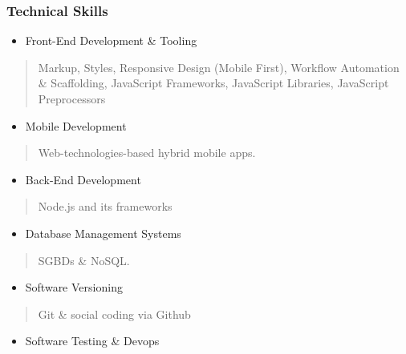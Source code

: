 \documentclass[]{article}
\providecommand{\tightlist}{%
  \setlength{\itemsep}{0pt}\setlength{\parskip}{0pt}}
\begin{document}
\subsubsection{Technical Skills}\label{technical-skills}

\begin{itemize}
\tightlist
\item
  Front-End Development \& Tooling
\end{itemize}

\begin{quote}
Markup, Styles, Responsive Design (Mobile First), Workflow Automation \&
Scaffolding, JavaScript Frameworks, JavaScript Libraries, JavaScript
Preprocessors
\end{quote}

\begin{itemize}
\tightlist
\item
  Mobile Development
\end{itemize}

\begin{quote}
Web-technologies-based hybrid mobile apps.
\end{quote}

\begin{itemize}
\tightlist
\item
  Back-End Development
\end{itemize}

\begin{quote}
Node.js and its frameworks
\end{quote}

\begin{itemize}
\tightlist
\item
  Database Management Systems
\end{itemize}

\begin{quote}
SGBDs \& NoSQL.
\end{quote}

\begin{itemize}
\tightlist
\item
  Software Versioning
\end{itemize}

\begin{quote}
Git \& social coding via Github
\end{quote}

\begin{itemize}
\tightlist
\item
  Software Testing \& Devops
\end{itemize}
\end{document}
